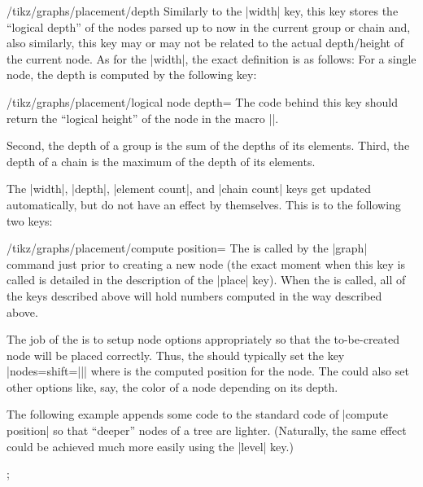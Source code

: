 \begin{key}{/tikz/graphs/placement/depth}
    Similarly to the |width| key, this key stores the ``logical depth'' of the
    nodes parsed up to now in the current group or chain and, also similarly,
    this key may or may not be related to the actual depth/height of the
    current node. As for the |width|, the exact definition is as follows: For a
    single node, the depth is computed by the following key:
    \begin{key}{/tikz/graphs/placement/logical node depth=}
        The code behind this key should return the ``logical height'' of the
        node  in the macro |\pgfmathresult|.
    \end{key}
    Second, the depth of a group is the sum of the depths of its elements.
    Third, the depth of a chain is the maximum of the depth of its elements.
\end{key}

The |width|, |depth|, |element count|, and |chain count| keys get updated
automatically, but do not have an effect by themselves. This is to the
following two keys:

\begin{key}{/tikz/graphs/placement/compute position=}
    The  is called by the |graph| command just prior to creating a
    new node (the exact moment when this key is called is detailed in the
    description of the |place| key). When the  is called, all of the
    keys described above will hold numbers computed in the way described above.

    The job of the  is to setup node options appropriately so that
    the to-be-created node will be placed correctly. Thus, the 
    should typically set the key |nodes={shift=||}| where
     is the computed position for the node. The 
    could also set other options like, say, the color of a node depending on
    its depth.

    The following example appends some code to the standard code of
    |compute position| so that ``deeper'' nodes of a tree are lighter.
    (Naturally, the same effect could be achieved much more easily using the
    |level| key.)
\begin{codeexample}[preamble={\usetikzlibrary{graphs}}]
\newcount\mycount
\def\lightendeepernodes{
  \pgfmathsetcount{\mycount}{
    100-20*\pgfkeysvalueof{/tikz/graphs/placement/width}
  }
  \edef\mydepth{\the\mycount}
  \tikzset{nodes={fill=red!\mydepth,circle,text=white}}
}
\tikz
  \graph [placement/compute position/.append code=\lightendeepernodes]
   {
     a -> {
       b -> c -> d,
       e -> {
         f,
         g
       },
       h
     }
   };
\end{codeexample}
\end{key}

